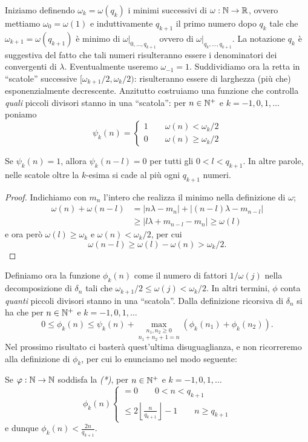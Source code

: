 Iniziamo definendo $\omega_k=\omega(q_k)$ i minimi successivi di $\omega:\mathbb{N}\rightarrow\mathbb{R}$, ovvero mettiamo $\omega_0=\omega(1)$ e induttivamente $q_{k+1}$ il primo numero dopo $q_k$ tale che $\omega_{k+1}=\omega(q_{k+1})$ è minimo di $\omega|_{0,\dots,q_{k+1}}$ ovvero di $\omega|_{q_k,\dots,q_{k+1}}$. La notazione $q_k$ è suggestiva del fatto che tali numeri risulteranno essere i denominatori dei convergenti di $\lambda$. Eventualmente useremo $\omega_{-1}=1$. \newline
Suddividiamo ora la retta in ``scatole'' successive $[\omega_{k+1}/2,\omega_k/2)$: risulteranno essere di larghezza (più che) esponenzialmente decrescente. Anzitutto costruiamo una funzione che controlla \emph{quali} piccoli divisori stanno in una ``scatola'': per $n\in\mathbb{N}^+$ e $k=-1,0,1,\dots$ poniamo
\[\psi_k(n)=\begin{cases}
   1 \qquad \omega(n)<\omega_k/2\\
   0 \qquad \omega(n)\geq \omega_k/2
  \end{cases}\]
\begin{lemma} Se $\psi_k(n)=1$, allora $\psi_k(n-l)=0$ per tutti gli $0<l<q_{k+1}$. In altre parole, nelle scatole oltre la $k$-esima si cade al più ogni $q_{k+1}$ numeri.\end{lemma}
\begin{proof}
 Indichiamo con $m_n$ l'intero che realizza il minimo nella definizione di $\omega$;
 \[\begin{split}
  \omega(n)+\omega(n-l) &=|n\lambda-m_n|+|(n-l)\lambda-m_{n-l}|\\
			&\geq |l\lambda+m_{n-l}-m_n|\geq \omega(l)
\end{split}\]
e ora però $\omega(l)\geq \omega_k$ e $\omega(n)<\omega_k/2$, per cui
\[\omega(n-l)\geq \omega(l)-\omega(n)>\omega_k/2.\] 
\end{proof}

Definiamo ora la funzione $\phi_k(n)$ come il numero di fattori $1/\omega(j)$ nella decomposizione di $\delta_n$ tali che $\omega_{k+1}/2\leq\omega(j)<\omega_k/2$. In altri termini, $\phi$ conta \emph{quanti} piccoli divisori stanno in una ``scatola''. Dalla definizione ricorsiva di $\delta_n$ si ha che per $n\in\mathbb{N}^+$ e $k=-1,0,1,\dots$
\[0\leq \phi_k(n)\leq\psi_k(n)+\underset{n_1+n_2+1=n}{\max_{n_1,n_2\geq 0}}(\phi_k(n_1)+\phi_k(n_2)).\tag{*}\]
Nel prossimo risultato ci basterà quest'ultima disuguaglianza, e non ricorreremo alla definizione di $\phi_k$, per cui lo enunciamo nel modo seguente:

\begin{lemma} Se $\varphi:\mathbb{N}\rightarrow\mathbb{N}$ soddisfa la \emph{(*)}, per $n\in\mathbb{N}^+$ e $k=-1,0,1,\dots$
 \[\phi_k(n)\begin{cases} =0 \qquad 0<n<q_{k+1}\\
    \leq 2\left\lfloor\frac{n}{q_{k+1}}\right\rfloor-1 \qquad n\geq q_{k+1}
   \end{cases}\]
   e dunque $\phi_k(n)<\frac{2n}{q_{k+1}}$.
   \end{lemma}
 
